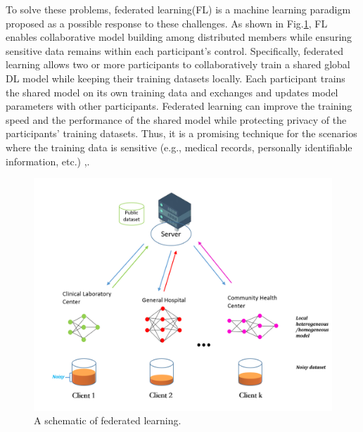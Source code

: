 \documentclass[conference]{IEEEtran}
\begin{document}
To solve these problems, federated learning(FL) is a machine learning paradigm proposed as a possible response to these
challenges\cite{b5}. As shown in Fig.\ref{fig1}, FL enables collaborative model building among distributed members while ensuring sensitive data remains
within each participant's control\cite{b6}. Specifically, federated learning allows two or more participants to collaboratively
train a shared global DL model while keeping their training datasets locally. Each participant trains the shared model on its own
training data and exchanges and updates model parameters with other participants. Federated learning can improve the training speed
and the performance of the shared model while protecting privacy of the participants' training datasets\cite{b7}. Thus, it is a promising
technique for the scenarios where the training data is sensitive (e.g., medical records, personally identifiable information, etc.) \cite{b8},\cite{b9}.

\begin{figure}[htbp]
    \centerline{\includegraphics[width=0.8\linewidth,height=0.6\linewidth]{picture/f1.png}}
    \caption{A schematic of federated learning.}
    \label{fig1}
\end{figure}
\end{document}
